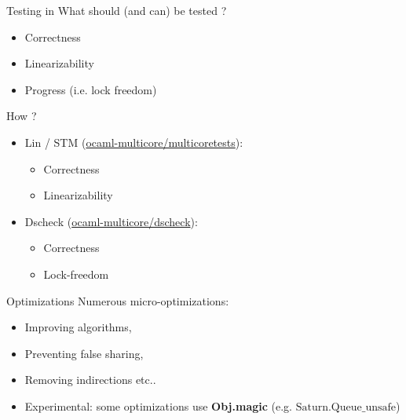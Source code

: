  \begin{frame}{Testing in \Saturn}
    What should (and can) be tested ?
    \begin{itemize}[label=$\bullet$]
     \item Correctness 
     \item Linearizability
     \item Progress (i.e. lock freedom) 
    \end{itemize}
    How ?
    \begin{itemize}[label=$\bullet$]
     \item Lin / STM (\href{https://github.com/ocaml-multicore/multicoretests}{ocaml-multicore/multicoretests}):
        \begin{itemize}[label=$\diamond$]
            \item Correctness
            \item Linearizability
        \end{itemize}
     \item Dscheck (\href{https://github.com/ocaml-multicore/dscheck}{ocaml-multicore/dscheck}):
     \begin{itemize}[label=$\diamond$]
        \item Correctness
        \item Lock-freedom
        \end{itemize}
    \end{itemize}
 
  \end{frame}



\begin{frame}{Optimizations}
    Numerous micro-optimizations:
    \begin{itemize}[label=$\diamond$]
        \item Improving algorithms,
        \item Preventing false sharing,
        \item Removing indirections etc..
        \item Experimental: some optimizations use \textbf{Obj.magic} (e.g. $\text{Saturn.Queue\_unsafe}$)
    \end{itemize}
\end{frame}

